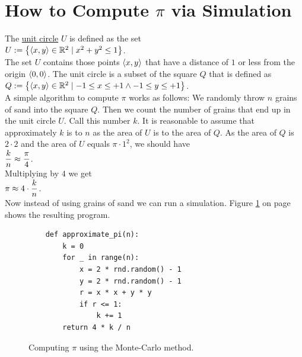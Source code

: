 \section{How to Compute $\pi$ via Simulation}
The \href{https://en.wikipedia.org/wiki/Unit_circle}{unit circle} $U$ is defined as the set 
\\[0.2cm]
\hspace*{1.3cm}
$U := \bigl\{ \pair(x,y) \in \mathbb{R}^2 \mid x^2 + y^2 \leq 1 \bigr\}$.
\\[0.2cm]
The set $U$ contains those points $\pair(x,y)$ that have a distance of $1$ or less from the origin
$\pair(0,0)$.  The unit circle is a subset of the square $Q$ that is defined as 
\\[0.2cm]
\hspace*{1.3cm}
$Q := \bigl\{ \pair(x,y) \in \mathbb{R}^2 \mid -1 \leq x \leq +1 \wedge -1 \leq y \leq +1 \bigr\}$.
\\[0.2cm]
A simple algorithm to compute $\pi$ works as follows:  We randomly throw $n$ grains of sand into the square $Q$.
Then we count the number of grains that end up in the unit circle $U$.  Call this number $k$.
It is reasonable to assume that approximately $k$ is to $n$ as the area of $U$ is to the area of $Q$.  As the area of $Q$ is
$2 \cdot 2$ and the area of $U$ equals $\pi \cdot 1^2$, we should have
\\[0.2cm]
\hspace*{1.3cm}
$\displaystyle\frac{k}{n} \approx \frac{\pi}{4}$.
\\[0.2cm]
Multiplying by $4$ we get
\\[0.2cm]
\hspace*{1.3cm}
$\displaystyle \pi \approx 4 \cdot \frac{k}{n}$.
\\[0.2cm]
Now instead of using grains of sand we can run a simulation.  Figure \ref{fig:Monte-Carlo-Pi.ipynb} on page
\pageref{fig:Monte-Carlo-Pi.ipynb} shows the resulting program.


\begin{figure}[!ht]
\centering
\begin{verbatim}
    def approximate_pi(n):
        k = 0
        for _ in range(n):
            x = 2 * rnd.random() - 1
            y = 2 * rnd.random() - 1
            r = x * x + y * y
            if r <= 1:
                k += 1
        return 4 * k / n
\end{verbatim}
\vspace*{-0.3cm}
\caption{Computing $\pi$ using the Monte-Carlo method.}
\label{fig:Monte-Carlo-Pi.ipynb}
\end{figure}

